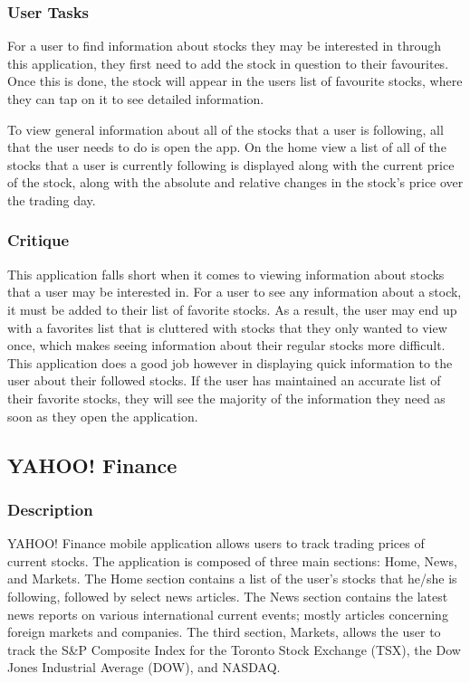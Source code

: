 \documentclass{sigchi}
\begin{document}
\subsubsection{User Tasks}
For a user to find information about stocks they may be interested in through this application, they first need to add the stock in question to their favourites.  Once this is done, the stock will appear in the users list of favourite stocks, where they can tap on it to see detailed information.\par
To view general information about all of the stocks that a user is following, all that the user needs to do is open the app.  On the home view a list of all of the stocks that a user is currently following is displayed along with the current price of the stock, along with the absolute and relative changes in the stock's price over the trading day.

\subsubsection{Critique}
This application falls short when it comes to viewing information about stocks that a user may be interested in.  For a user to see any information about a stock, it must be added to their list of favorite stocks.  As a result, the user may end up with a favorites list that is cluttered with stocks that they only wanted to view once, which makes seeing information about their regular stocks more difficult.  This application does a good job however in displaying quick information to the user about their followed stocks.  If the user has maintained an accurate list of their favorite stocks, they will see the majority of the information they need as soon as they open the application.



\subsection{YAHOO! Finance}
\subsubsection{Description}
YAHOO! Finance mobile application allows users to track trading prices of current stocks. The application is composed of three main sections: Home, News, and Markets. The Home section contains a list of the user’s stocks that he/she is following, followed by select news articles. The News section contains the latest news reports on various international current events; mostly articles concerning foreign markets and companies. The third section, Markets, allows the user to track the S\&P Composite Index for the Toronto Stock Exchange (TSX), the Dow Jones Industrial Average (DOW), and NASDAQ. 
\end{document}
